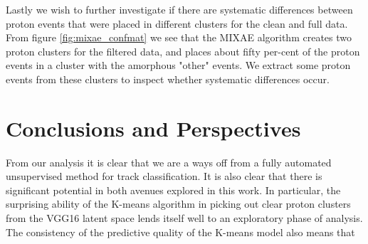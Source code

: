 \documentclass[review,number,sort&compress]{elsarticle}
\begin{document}
Lastly we wish to further investigate if there are systematic differences between proton events that were placed in different clusters for the clean and full data. From figure \ref{fig:mixae_confmat} we see that the MIXAE algorithm creates two proton clusters for the filtered data, and places about fifty per-cent of the proton events in a cluster with the amorphous "other" events. We extract some proton events from these clusters to inspect whether systematic differences occur. 


\section{Conclusions and Perspectives}\label{sec{conclusion}}

From our analysis it is clear that we are a ways off from a fully automated unsupervised method for track classification. It is also clear that there is significant potential in both avenues explored in this work. 
In particular, the surprising ability of the K-means algorithm in picking out clear proton clusters from the VGG16 latent space lends itself well to an exploratory phase of analysis. The consistency of the predictive quality of the K-means model also means that 

\appendix  
\end{document}
